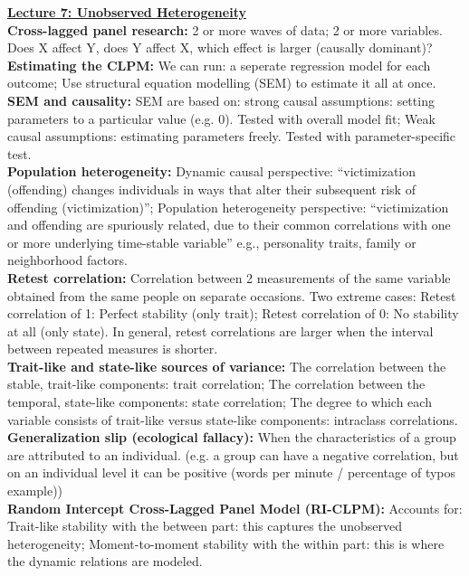 \documentclass[a4paper,7pt,landscape]{extarticle}
\begin{document}
\begin{multicols}{3}
\begin{boxA}
\underline{\textbf{Lecture 7: Unobserved Heterogeneity}}\\
\textbf{Cross-lagged panel research:} 2 or more waves of data; 2 or more variables. Does X affect Y, does Y affect X, which effect is larger (causally dominant)?\\
\textbf{Estimating the CLPM:} We can run: a seperate regression model for each outcome; Use structural equation modelling (SEM) to estimate it all at once.\\
\textbf{SEM and causality:} SEM are based on: strong causal assumptions: setting parameters to a particular value (e.g. 0). Tested with overall model fit; Weak causal assumptions: estimating parameters freely. Tested with parameter-specific test.\\
\textbf{Population heterogeneity:} Dynamic causal perspective: “victimization (offending) changes individuals in ways that alter their subsequent risk of offending (victimization)”; Population heterogeneity perspective: “victimization and offending are spuriously related, due to their common correlations with one or more underlying time-stable variable” e.g., personality traits, family or neighborhood factors.\\
\textbf{Retest correlation:} Correlation between 2 measurements of the same variable obtained from the same people on separate occasions. Two extreme cases: Retest correlation of 1: Perfect stability (only trait); Retest correlation of 0: No stability at all (only state). In general, retest correlations are larger when the interval between repeated measures is shorter.\\
\textbf{Trait-like and state-like sources of variance:} The correlation between the stable, trait-like components: trait correlation; The correlation between the temporal, state-like components: state correlation; The degree to which each variable consists of trait-like versus state-like components: intraclass correlations.\\
\textbf{Generalization slip (ecological fallacy):} When the characteristics of a group are attributed to an individual. (e.g. a group can have a negative correlation, but on an individual level it can be positive (words per minute / percentage of typos example))\\
\textbf{Random Intercept Cross-Lagged Panel Model (RI-CLPM):} Accounts for: Trait-like stability with the between part: this captures the unobserved heterogeneity; Moment-to-moment stability with the within part: this is where the dynamic relations are modeled.\\

\end{boxA}
\end{multicols}
\end{document}
